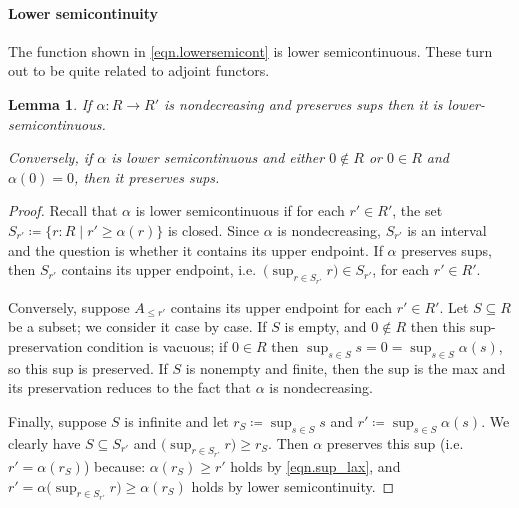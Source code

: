 \documentclass[11pt, one side, article]{memoir}
\theoremstyle{definition}
\theoremstyle{plain}
\newtheorem{lemma}[definitionx]{Lemma}
\newenvironment{example}
  {\pushQED{\qed}\renewcommand{\qedsymbol}{$\lozenge$}\examplex}
  {\popQED\endexamplex}
\renewcommand{\ss}{\subseteq}
\DeclarePairedDelimiter{\floor}{\lfloor}{\rfloor}
\DeclarePairedDelimiter{\ceil}{\lceil}{\rceil}
\newcommand{\ldag}{^{\rotatebox{180}{$\dagger$}}}
\newcommand{\blank}[1][1pt]{\hspace{#1}\cdot\hspace{#1}}
\newcommand{\flr}[2][\blank]{\floor{#1}_{#2}}
\newcommand{\clg}[2][\blank]{\ceil{#1}_{#2}}
\begin{document}

\paragraph{Lower semicontinuity}

The function shown in \cref{eqn.lowersemicont} is lower semicontinuous. These turn out to be quite related to adjoint functors.

\begin{lemma}\label{lemma.sups_lower_semi}
If $\alpha\colon R\to R'$ is nondecreasing and preserves sups then it is lower-semicontinuous. 

Conversely, if $\alpha$ is lower semicontinuous and either $0\not\in R$ or $0\in R$ and $\alpha(0)=0$, then it preserves sups.
\end{lemma}
\begin{proof}
Recall that $\alpha$ is lower semicontinuous if for each $r'\in R'$, the set $S_{r'}\coloneqq\{r:R\mid r'\geq\alpha(r)\}$ is closed. Since $\alpha$ is nondecreasing, $S_{r'}$ is an interval and the question is whether it contains its upper endpoint. If $\alpha$ preserves sups, then $S_{r'}$ contains its upper endpoint, i.e.\ $\big(\sup_{r\in S_{r'}}r\big)\in S_{r'}$, for each $r'\in R'$. 

Conversely, suppose $A_{\leq r'}$ contains its upper endpoint for each $r'\in R'$. Let $S\ss R$ be a subset; we consider it case by case. If $S$ is empty, and $0\not\in R$ then this sup-preservation condition is vacuous; if $0\in R$ then $\sup_{s\in S}s=0=\sup_{s\in S}\alpha(s)$, so this sup is preserved. If $S$ is nonempty and finite, then the sup is the max and its preservation reduces to the fact that $\alpha$ is nondecreasing. 

Finally, suppose $S$ is infinite and let $r_S\coloneqq\sup_{s\in S}s$ and $r'\coloneqq\sup_{s\in S}\alpha(s)$. We clearly have $S\ss S_{r'}$ and $\big(\sup_{r\in S_{r'}}r\big)\geq r_S$. Then $\alpha$ preserves this sup (i.e.\ $r'=\alpha(r_S)$) because: $\alpha(r_S)\geq r'$ holds by \eqref{eqn.sup_lax}, and $r'=\alpha\big(\sup_{r\in S_{r'}}r\big)\geq\alpha(r_S)$ holds by lower semicontinuity.
\end{proof}
\end{document}

